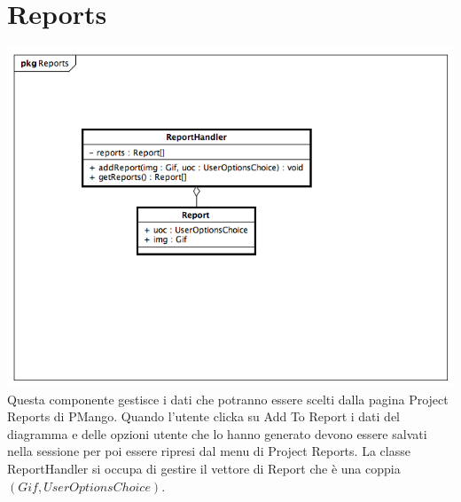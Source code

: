 \documentclass[a4paper, 12pt]{report}
\begin{document}
\section{Reports}
\includegraphics[width=\textwidth]{chart/Reports.png}
Questa componente gestisce i dati che potranno essere scelti dalla pagina Project Reports di PMango. Quando l'utente clicka su Add To Report i dati del diagramma e delle opzioni utente che lo hanno generato devono essere salvati nella sessione per poi essere ripresi dal menu di Project Reports.
La classe ReportHandler si occupa di gestire il vettore di Report che \`e una coppia $(Gif,UserOptionsChoice)$.
\end{document}
